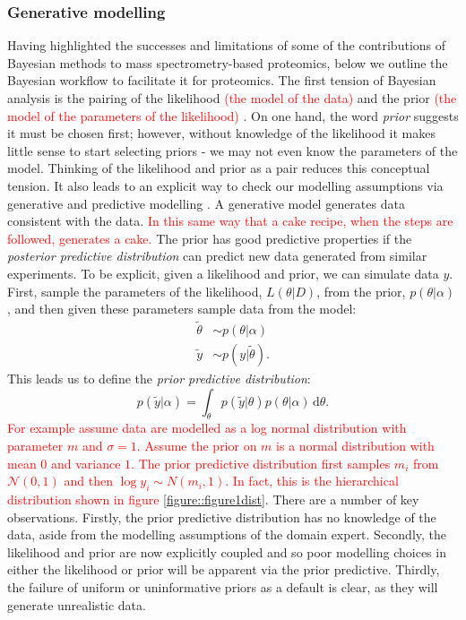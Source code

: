 \documentclass[12pt,english, journal=jpr, layout=twocolumn]{article}
\begin{document}
\subsubsection{Generative modelling}
Having highlighted the successes and limitations of some of the contributions of Bayesian methods to mass spectrometry-based proteomics, below we outline the Bayesian workflow to facilitate it for proteomics. The first tension of Bayesian analysis is the pairing of the likelihood \textcolor{red}{(the model of the data)} and the prior \textcolor{red}{(the model of the parameters of the likelihood)} \citep{Gelman::2017, Gelman::2020, Betancourt::2021}. On one hand, the word \textit{prior} suggests it must be chosen first; however, without knowledge of the likelihood it makes little sense to start selecting priors - we  may not even know the parameters of the model. Thinking of the likelihood and prior as a pair reduces this conceptual tension. It also leads to an explicit way to check our modelling assumptions via generative and predictive modelling \citep{Betancourt::2021}. A generative model generates data consistent with the data. \textcolor{red}{ In this same way that a cake recipe, when the steps are followed, generates a cake.} The prior has good predictive properties if the \textit{posterior predictive distribution} can predict new data generated from similar experiments. To be explicit, given a likelihood and prior, we can simulate data $y$. First, sample the parameters of the likelihood, $ L(\theta|D)$, from the prior, $p(\theta|\alpha)$, and then given these parameters sample data from the model:	
\begin{equation}
\begin{split}
\tilde{\theta} &\sim p(\theta|\alpha) \\
\tilde{y} & \sim p(y|\tilde{\theta}).
\end{split}
\end{equation}
This leads us to define the \textit{prior predictive distribution}:
\begin{equation}
p(\tilde{y}|\alpha) = \int_{\theta} p(\tilde{y}|\theta)p(\theta|\alpha)\, \text{d}\theta.
\end{equation}
\textcolor{red}{For example assume data are modelled as a log normal distribution with parameter $m$ and $\sigma = 1$. Assume the prior on $m$ is a normal distribution with mean $0$ and variance $1$. The prior predictive distribution first samples $m_i$ from $\mathcal{N}(0,1)$ and then $\log y_i \sim N(m_i, 1)$. In fact, this is the hierarchical distribution shown in figure \ref{figure::figure1dist}}. There are a number of key observations. Firstly, the prior predictive distribution has no knowledge of the data, aside from the modelling assumptions of the domain expert. Secondly, the likelihood and prior are now explicitly coupled and so poor modelling choices in either the likelihood or prior will be apparent via the prior predictive. Thirdly, the failure of uniform or uninformative priors as a default is clear, as they will generate unrealistic data.
\end{document}
